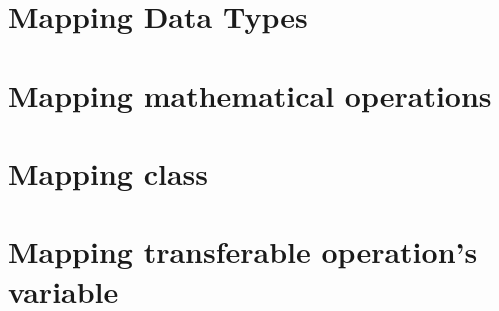 \section{Mapping Data Types}
\label{sec_tra_mapping_data_types}


\section{Mapping mathematical operations}
\label{sec_tra_mapping_mathematical_operations}



\section{Mapping class}
\label{sec_tra_mapping_class}


\section{Mapping transferable operation's variable}
\label{sec_tra_mapping_transferable_operation}


